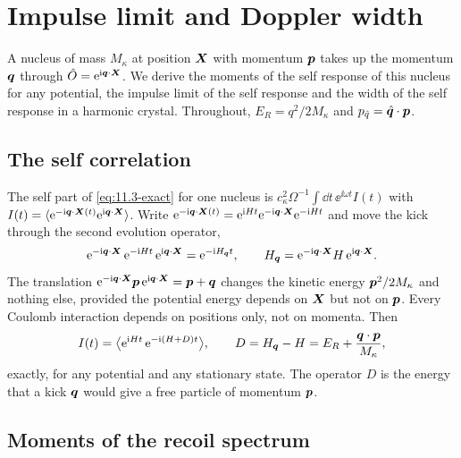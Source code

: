 \section{Impulse limit and Doppler width}\label{app:D.32}

A nucleus of mass $M_\kappa$ at position $\bm{X}$ with momentum $\bm{p}$ takes up the momentum $\bm{q}$ through $\hat{O} = \mathrm{e}^{\mathrm{i}\bm{q}\cdot\bm{X}}$. We derive the moments of the self response of this nucleus for any potential, the impulse limit of the self response and the width of the self response in a harmonic crystal. Throughout, $E_R = q^2/2M_\kappa$ and $p_{\hat q} = \hat{\bm{q}}\cdot\bm{p}$.

\subsection{The self correlation}

The self part of \cref{eq:11.3-exact} for one nucleus is $c_\kappa^2\Omega^{-1}\int\dd t\,\ee^{\ii\omega t}I(t)$ with $I(t) = \langle\mathrm{e}^{-\mathrm{i}\bm{q}\cdot\bm{X}(t)}\mathrm{e}^{\mathrm{i}\bm{q}\cdot\bm{X}}\rangle$. Write $\mathrm{e}^{-\mathrm{i}\bm{q}\cdot\bm{X}(t)} = \mathrm{e}^{\mathrm{i} Ht}\mathrm{e}^{-\mathrm{i}\bm{q}\cdot\bm{X}}\mathrm{e}^{-\mathrm{i} Ht}$ and move the kick through the second evolution operator,
\begin{equation*}
  \mathrm{e}^{-\mathrm{i}\bm{q}\cdot\bm{X}}\,\mathrm{e}^{-\mathrm{i} Ht}\,\mathrm{e}^{\mathrm{i}\bm{q}\cdot\bm{X}} = \mathrm{e}^{-\mathrm{i} H_{\bm{q}}t} , \qquad H_{\bm{q}} = \mathrm{e}^{-\mathrm{i}\bm{q}\cdot\bm{X}}H\,\mathrm{e}^{\mathrm{i}\bm{q}\cdot\bm{X}} .
\end{equation*}
The translation $\mathrm{e}^{-\mathrm{i}\bm{q}\cdot\bm{X}}\bm{p}\,\mathrm{e}^{\mathrm{i}\bm{q}\cdot\bm{X}} = \bm{p} + \bm{q}$ changes the kinetic energy $\bm{p}^2/2M_\kappa$ and nothing else, provided the potential energy depends on $\bm{X}$ but not on $\bm{p}$. Every Coulomb interaction depends on positions only, not on momenta. Then
\begin{equation}
  I(t) = \bigl\langle\mathrm{e}^{\mathrm{i} Ht}\,\mathrm{e}^{-\mathrm{i}(H + D)t}\bigr\rangle , \qquad D = H_{\bm{q}} - H = E_R + \frac{\bm{q}\cdot\bm{p}}{M_\kappa} ,
  \label{eq:D.32-I}
\end{equation}
exactly, for any potential and any stationary state. The operator $D$ is the energy that a kick $\bm{q}$ would give a free particle of momentum $\bm{p}$.

\subsection{Moments of the recoil spectrum}

